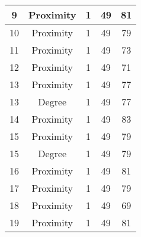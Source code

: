 \documentclass[results.tex]{subfiles}
\begin{document}
\begin{center}
\begin{tabular}{| c || c | c | c | c |}
            \hline
            9                       & Proximity                    & 1                      & 49                      & 81                   \\
            \hline
            10                      & Proximity                    & 1                      & 49                      & 79                   \\
            \hline
            11                      & Proximity                    & 1                      & 49                      & 73                   \\
            \hline
            12                      & Proximity                    & 1                      & 49                      & 71                   \\
            \hline
            13                      & Proximity                    & 1                      & 49                      & 77                   \\
            \hline
            13                      & Degree                       & 1                      & 49                      & 77                   \\
            \hline
            14                      & Proximity                    & 1                      & 49                      & 83                   \\
            \hline
            15                      & Proximity                    & 1                      & 49                      & 79                   \\
            \hline
            15                      & Degree                       & 1                      & 49                      & 79                   \\
            \hline
            16                      & Proximity                    & 1                      & 49                      & 81                   \\
            \hline
            17                      & Proximity                    & 1                      & 49                      & 79                   \\
            \hline
            18                      & Proximity                    & 1                      & 49                      & 69                   \\
            \hline
            19                      & Proximity                    & 1                      & 49                      & 81                   \\

\end{tabular}
\end{center}
\end{document}
